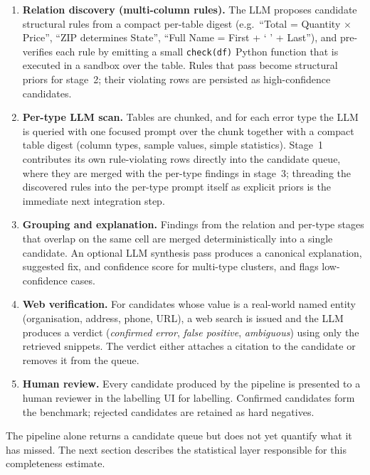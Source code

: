 \documentclass[11pt]{article}
\begin{document}
\begin{enumerate}
  \item \textbf{Relation discovery (multi-column rules).}
    The LLM proposes candidate structural rules from a
    compact per-table digest (e.g.\
    ``Total = Quantity $\times$ Price'',
    ``ZIP determines State'',
    ``Full Name = First + ` ' + Last''), and pre-verifies
    each rule by emitting a small \texttt{check(df)} Python
    function that is executed in a sandbox over the table.
    Rules that pass become structural priors for stage~2;
    their violating rows are persisted as high-confidence
    candidates.

  \item \textbf{Per-type LLM scan.} Tables are chunked,
    and for each error type the LLM is queried with one
    focused prompt over the chunk together with a compact
    table digest (column types, sample values, simple
    statistics). Stage~1 contributes its own
    rule-violating rows directly into the candidate queue,
    where they are merged with the per-type findings in
    stage~3; threading the discovered rules into the
    per-type prompt itself as explicit priors is the
    immediate next integration step.

  \item \textbf{Grouping and explanation.} Findings from the
    relation and per-type stages that overlap on the same
    cell are merged deterministically into a single
    candidate. An optional LLM synthesis pass produces a
    canonical explanation, suggested fix, and confidence
    score for multi-type clusters, and flags low-confidence
    cases.

  \item \textbf{Web verification.} For candidates whose
    value is a real-world named entity (organisation,
    address, phone, URL), a web search is issued and the
    LLM produces a verdict (\emph{confirmed error},
    \emph{false positive}, \emph{ambiguous}) using only
    the retrieved snippets. The verdict either attaches a
    citation to the candidate or removes it from the queue.

  \item \textbf{Human review.} Every candidate produced by
    the pipeline is presented to a human reviewer in the
    labelling UI for labelling. Confirmed candidates form
    the benchmark; rejected candidates are retained as
    hard negatives.
\end{enumerate}

\begin{callout}
The pipeline alone returns a candidate queue but does not yet
quantify what it has missed. The next section describes the
statistical layer responsible for this completeness estimate.
\end{callout}
\end{document}
